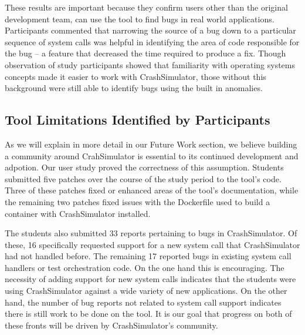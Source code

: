 These results are important
because they confirm
users other than the original development team,
can use the tool to find bugs in real world applications.
Participants commented that narrowing the source of a bug
down to a particular sequence of system calls
was helpful in identifying the area of
code responsible for the bug -- a feature
that decreased the time required to produce a fix.
Though observation of study participants
showed that familiarity with operating systems concepts
made it easier to work with CrashSimulator,
those without this background were still able to identify bugs using the
built in anomalies.

\subsection{Tool Limitations Identified by Participants}
\label{subsec:crashsim-patches}

As we will explain in more detail in our Future Work section,
we believe building a community around CrahSimulator is essential to its
continued development and adpotion.  Our user study proved the correctness
of this assumption.
Students submitted five patches over the
course of the study period to the tool's code.
Three of these patches fixed or enhanced areas of
the tool's documentation, while the remaining two patches fixed issues with the
Dockerfile used to build a container with CrashSimulator installed.

The students also submitted 33 reports pertaining to bugs in CrashSimulator.
Of these, 16 specifically requested support for a new system call that
CrashSimulator had not handled before.  The remaining 17 reported bugs in
existing system call handlers or test orchestration code.
On the one hand this is encouraging.  The necessity of adding
support for new system calls
indicates that the students were
using CrashSimulator against a wide variety of new applications.
On the other hand, the number of bug reports not related to system call support
indicates there is still work to be done on the tool.
It is our goal that progress on both of these fronts will be driven by
CrashSimulator's community.

